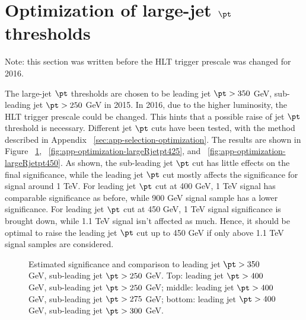 \section{Optimization of large-\R jet $\pt$ thresholds}
\label{sec:app-optimization-largeRjetpt}

Note: this section was written before the HLT trigger prescale was changed for 2016.

The large-\R jet $\pt$ thresholds are chosen to be leading jet $\pt >  350 $ GeV, sub-leading jet $ \pt >  250 $ GeV in 2015. In 2016, due to the higher luminosity, the HLT trigger prescale could be changed. This hints that a possible raise of jet $\pt$ threshold is necessary. Different jet $\pt$ cuts have been tested, with the method described in Appendix ~\ref{sec:app-selection-optimization}. The results are shown in Figure ~\ref{fig:app-optimization-largeRjetpt400}, ~\ref{fig:app-optimization-largeRjetpt425}, and ~\ref{fig:app-optimization-largeRjetpt450}. As shown, the sub-leading jet $\pt$ cut has little effects on the final significance, while the leading jet $\pt$ cut mostly affects the significance for signal around 1 TeV. For leading jet  $\pt$ cut at 400 GeV, 1 TeV signal has comparable significance as before, while 900 GeV signal sample has a lower significance. For leading jet $\pt$ cut at 450 GeV, 1 TeV signal significance is brought down, while 1.1 TeV signal isn't affected as much. Hence, it should be optimal to raise the leading jet $\pt$ cut up to 450 GeV if only above 1.1 TeV signal samples are considered.

\begin{figure*}[htbp!]
\begin{center}
  \caption{Estimated significance and comparison to leading jet $\pt >  350 $ GeV, sub-leading jet $ \pt >  250 $ GeV. Top: leading jet $\pt >  400 $ GeV, sub-leading jet $ \pt >  250 $ GeV; middle: leading jet $\pt >  400 $ GeV, sub-leading jet $ \pt >  275 $ GeV; bottom: leading jet $\pt >  400 $ GeV, sub-leading jet $ \pt > 300 $ GeV. }
  \label{fig:app-optimization-largeRjetpt400}
\end{center}
\end{figure*}


